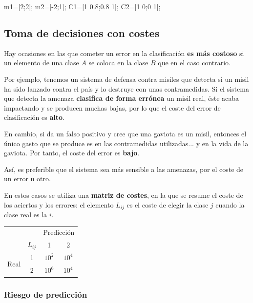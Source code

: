 \documentclass[11pt]{scrartcl}
\begin{document}
\begin{matlabcode}
m1=[2;2]; m2=[-2;1]; 
C1=[1 0.8;0.8 1]; C2=[1 0;0 1];  
\end{matlabcode}

\subsection{Toma de decisiones con costes}

Hay ocasiones en las que cometer un error en la clasificación \textbf{es más
  costoso} si un elemento de una clase $A$ se coloca en la clase $B$ que en el
caso contrario.

Por ejemplo, tenemos un sistema de defensa contra misiles que detecta si un
misil ha sido lanzado contra el país y lo destruye con unas contramedidas. Si el
sistema que detecta la amenaza \textbf{clasifica de forma errónea} un misil
real, éste acaba impactando y se producen muchas bajas, por lo que el coste del
error de clasificación es \textbf{alto}.

En cambio, si da un falso positivo y cree que una gaviota es un misil, entonces
el único gasto que se produce es en las contramedidas utilizadas... y en la vida
de la gaviota. Por tanto, el coste del error es \textbf{bajo}.

Así, es preferible que el sistema sea más sensible a las amenazas, por el coste
de un error u otro.

En estos casos se utiliza una \textbf{matriz de costes}, en la que se resume el
coste de los aciertos y los errores: el elemento $L_{ij}$ es el coste de elegir
la clase $j$ cuando la clase real es la $i$.

\begin{center}
  \begin{tabular}[h!]{c c|c|c}
    &         & \multicolumn{2}{c}{Predicción} \\ \cline{2-4}
    & $L_{ij}$ & 1 & 2 \\ \hline
    \multirow{2}{*}{
      \begin{sideways}
        Real
      \end{sideways}
    } & 1 & $10^2$ & $10^4$ \\ \cline{2-4}
    & 2 & $10^6$ & $10^4$ 
  \end{tabular}
\end{center}


\subsubsection{Riesgo de predicción}
\end{document}

